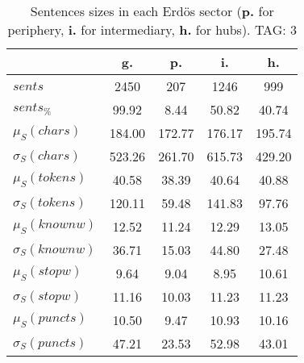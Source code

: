 \begin{table}[h!]
\begin{center}
\begin{tabular}{| l | c | c | c | c |}\hline
 & g. & p. & i. & h. \\\hline
$sents$ & 2450  & 207  & 1246  & 999 \\\hline
$sents_{\%}$ & 99.92  & 8.44  & 50.82  & 40.74 \\\hline
$\mu_S(chars)$ & 184.00  & 172.77  & 176.17  & 195.74 \\\hline
$\sigma_S(chars)$ & 523.26  & 261.70  & 615.73  & 429.20 \\\hline
$\mu_S(tokens)$ & 40.58  & 38.39  & 40.64  & 40.88 \\\hline
$\sigma_S(tokens)$ & 120.11  & 59.48  & 141.83  & 97.76 \\\hline
$\mu_S(knownw)$ & 12.52  & 11.24  & 12.29  & 13.05 \\\hline
$\sigma_S(knownw)$ & 36.71  & 15.03  & 44.80  & 27.48 \\\hline
$\mu_S(stopw)$ & 9.64  & 9.04  & 8.95  & 10.61 \\\hline
$\sigma_S(stopw)$ & 11.16  & 10.03  & 11.23  & 11.23 \\\hline
$\mu_S(puncts)$ & 10.50  & 9.47  & 10.93  & 10.16 \\\hline
$\sigma_S(puncts)$ & 47.21  & 23.53  & 52.98  & 43.01 \\\hline
\end{tabular}
\caption{Sentences sizes in each Erd\"os sector ({{\bf p.}} for periphery, {{\bf i.}} for intermediary, {{\bf h.}} for hubs). TAG: 3}
\end{center}
\end{table}